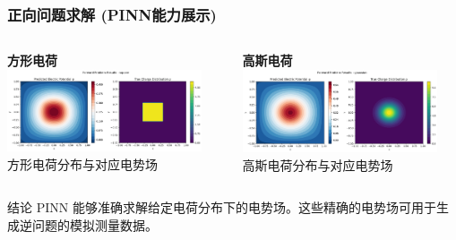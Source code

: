 \documentclass[aspectratio=169]{ctexbeamer}
\begin{document}
\begin{frame}
	\frametitle{正向问题求解 (PINN能力展示)}
	\begin{columns}[T]
		\begin{column}{0.5\textwidth}
			\centering
			\textbf{方形电荷} \\
			\includegraphics[width=0.9\textwidth]{figures/forward_square_combined.png} \\
			\tiny 方形电荷分布与对应电势场
		\end{column}
		\begin{column}{0.5\textwidth}
			\centering
			\textbf{高斯电荷} \\
			\includegraphics[width=0.9\textwidth]{figures/forward_gaussian_combined.png} \\
			\tiny 高斯电荷分布与对应电势场
		\end{column}
	\end{columns}
	\vspace{1em}
	\begin{block}{结论}
		PINN 能够准确求解给定电荷分布下的电势场。这些精确的电势场可用于生成逆问题的模拟测量数据。
	\end{block}
\end{frame}

\end{document}
